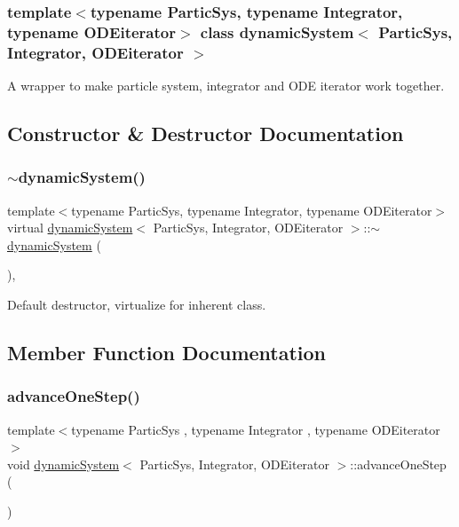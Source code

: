 \subsubsection*{template$<$typename Partic\+Sys, typename Integrator, typename O\+D\+Eiterator$>$\newline
class dynamic\+System$<$ Partic\+Sys, Integrator, O\+D\+Eiterator $>$}

A wrapper to make particle system, integrator and O\+DE iterator work together. 

\subsection{Constructor \& Destructor Documentation}
\mbox{\label{classdynamic_system_a5818e6ffd72fcbfcac01738f5cb8d7a3}} 
\subsubsection{\texorpdfstring{$\sim$dynamic\+System()}{~dynamicSystem()}}
{\footnotesize\ttfamily template$<$typename Partic\+Sys, typename Integrator, typename O\+D\+Eiterator$>$ \\
virtual \mbox{\hyperlink{classdynamic_system}{dynamic\+System}}$<$ Partic\+Sys, Integrator, O\+D\+Eiterator $>$\+::$\sim$\mbox{\hyperlink{classdynamic_system}{dynamic\+System}} (\begin{DoxyParamCaption}{ }\end{DoxyParamCaption})\hspace{0.3cm}{\ttfamily [inline]}, {\ttfamily [virtual]}}



Default destructor, virtualize for inherent class. 



\subsection{Member Function Documentation}
\mbox{\label{classdynamic_system_a3b6569e359c6451a038107455903c6a1}} 
\subsubsection{\texorpdfstring{advance\+One\+Step()}{advanceOneStep()}}
{\footnotesize\ttfamily template$<$typename Partic\+Sys , typename Integrator , typename O\+D\+Eiterator $>$ \\
void \mbox{\hyperlink{classdynamic_system}{dynamic\+System}}$<$ Partic\+Sys, Integrator, O\+D\+Eiterator $>$\+::advance\+One\+Step (\begin{DoxyParamCaption}{ }\end{DoxyParamCaption})\hspace{0.3cm}{\ttfamily [inline]}}



